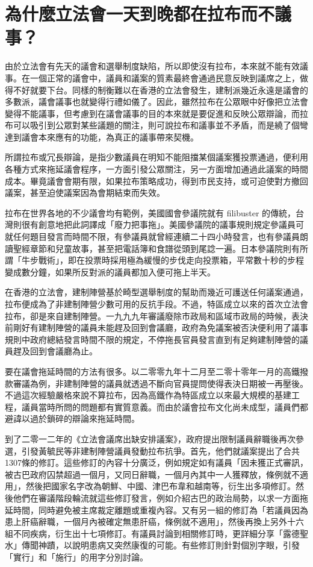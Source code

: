 \section{為什麼立法會一天到晚都在拉布而不議事？}

由於立法會有先天的議會和選舉制度缺陷，所以即使沒有拉布，本來就不能有效議事。在一個正常的議會中，議員和議案的質素最終會通過民意反映到議席之上，做得不好就要下台。同樣的制衡難以在香港的立法會發生，建制派幾近永遠是議會的多數派，議會議事也就變得行禮如儀了。因此，雖然拉布在公眾眼中好像把立法會變得不能議事，但考慮到在議會議事的目的本來就是要促進和反映公眾辯論，而拉布可以吸引到公眾對某些議題的關注，則可說拉布和議事並不矛盾，而是繞了個彎達到議會本來應有的功能，為真正的議事帶來契機。

所謂拉布或冗長辯論，是指少數議員在明知不能阻擋某個議案獲投票通過，便利用各種方式來拖延議會程序，一方面引發公眾關注，另一方面增加通過此議案的時間成本。畢竟議會會期有限，如果拉布策略成功，得到市民支持，或可迫使對方撤回議案，甚至迫使議案因為會期結束而失效。

拉布在世界各地的不少議會均有範例，美國國會參議院就有 filibuster 的傳統，台灣則很有創意地把此詞譯成「廢力把事拖」。美國參議院的議事規則規定參議員可就任何題目發言而時間不限，有參議員就曾經連續二十四小時發言，也有參議員朗讀聖經章節和兒童故事，甚至把電話簿和食譜從頭到尾諗一遍。日本參議院則有所謂「牛步戰術」，即在投票時採用極為緩慢的步伐走向投票箱，平常數十秒的步程變成數分鐘，如果所反對派的議員都加入便可拖上半天。

在香港的立法會，建制陣營基於畸型選舉制度的幫助而幾近可護送任何議案通過，拉布便成為了非建制陣營少數可用的反抗手段。不過，特區成立以來的首次立法會拉布，卻是來自建制陣營。一九九九年審議廢除市政局和區域市政局的時候，表決前剛好有建制陣營的議員未能趕及回到會議廳，政府為免議案被否決便利用了議事規則中政府總結發言時間不限的規定，不停拖長官員發言直到有足夠建制陣營的議員趕及回到會議廳為止。

要在議會拖延時間的方法有很多。以二零零九年十二月至二零十零年一月的高鐵撥款審議為例，非建制陣營的議員就透過不斷向官員提問使得表決日期被一再壓後。不過這次經驗嚴格來說不算拉布，因為高鐵作為特區成立以來最大規模的基建工程，議員當時所問的問題都有實質意義。而由於議會拉布文化尚未成型，議員們都避諱以過於鎖碎的辯論來拖延時間。

到了二零一二年的《立法會議席出缺安排議案》，政府提出限制議員辭職後再次參選，引發黃毓民等非建制陣營議員發動拉布抗爭。首先，他們就議案提出了合共1307條的修訂。這些修訂的內容十分廣泛，例如規定如有議員「因未獲正式審訊，被古巴政府囚禁超過一個月，又同日辭職，一個月內其中一人獲釋放，條例就不適用」，然後把國家名字改為朝鮮、中國、津巴布韋和越南等，衍生出多項修訂。然後他們在審議階段輪流就這些修訂發言，例如介紹古巴的政治局勢，以求一方面拖延時間，同時避免被主席裁定離題或重複內容。又有另一組的修訂為「若議員因為患上肝癌辭職，一個月內被確定無患肝癌，條例就不適用」，然後再換上另外十六組不同疾病，衍生出十七項修訂。有議員討論到相關修訂時，更詳細分享「露德聖水」傳聞神蹟，以說明患病又突然康復的可能。有些修訂則針對個別字眼，引發「實行」和「施行」的用字分別討論。

